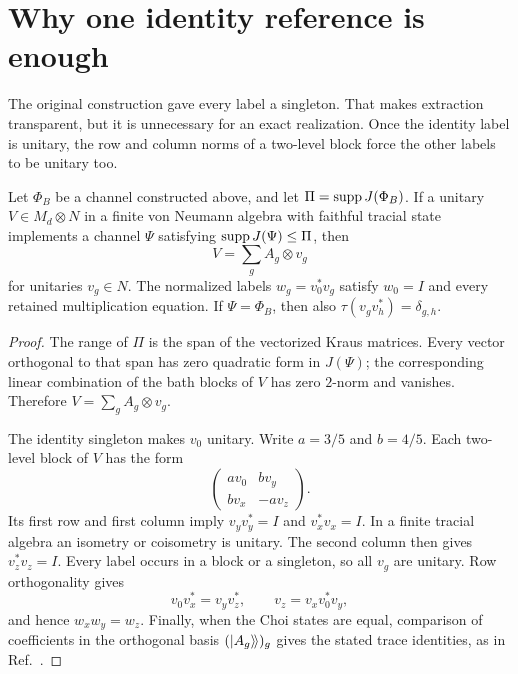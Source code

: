 \documentclass[11pt]{article}
\begin{document}
\section{Why one identity reference is enough}\label{sec:extraction}

The original construction gave every label a singleton. That makes extraction transparent,
but it is unnecessary for an exact realization. Once the identity label is unitary, the row
and column norms of a two-level block force the other labels to be unitary too.

\begin{lemma}\label{lem:extract}
Let $\Phi_B$ be a channel constructed above, and let $\Pi=\operatorname{supp} J(\Phi_B)$.
If a unitary $V\in M_d\otimes N$ in a finite von Neumann algebra with faithful tracial
state implements a channel $\Psi$ satisfying $\operatorname{supp} J(\Psi)\le\Pi$, then
\[
 V=\sum_g A_g\otimes v_g
\]
for unitaries $v_g\in N$. The normalized labels $w_g=v_0^*v_g$ satisfy $w_0=I$ and
every retained multiplication equation. If $\Psi=\Phi_B$, then also
$\tau(v_gv_h^*)=\delta_{g,h}$.
\end{lemma}
\begin{proof}
The range of $\Pi$ is the span of the vectorized Kraus matrices. Every vector orthogonal
to that span has zero quadratic form in $J(\Psi)$; the corresponding linear combination
of the bath blocks of $V$ has zero $2$-norm and vanishes. Therefore $V=\sum_gA_g\otimes v_g$.

The identity singleton makes $v_0$ unitary. Write $a=3/5$ and $b=4/5$. Each two-level
block of $V$ has the form
\[
 \begin{pmatrix}av_0&bv_y\\bv_x&-av_z\end{pmatrix}.
\]
Its first row and first column imply $v_yv_y^*=I$ and $v_x^*v_x=I$.
In a finite tracial algebra an isometry or coisometry is unitary. The second column then
gives $v_z^*v_z=I$. Every label occurs in a block or a singleton, so all $v_g$ are unitary.
Row orthogonality gives
\[
 v_0v_x^*=v_yv_z^*,\qquad v_z=v_xv_0^*v_y,
\]
and hence $w_xw_y=w_z$. Finally, when the Choi states are equal, comparison of coefficients
in the orthogonal basis $(\lvert A_g\rangle\!\rangle)_g$ gives the stated trace identities, as in
Ref.~\cite[Theorem~2.2]{hm11}.
\end{proof}
\end{document}
